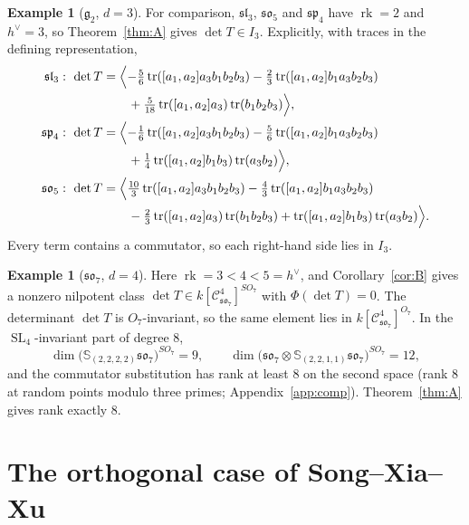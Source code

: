 \documentclass[11pt]{article}
\theoremstyle{definition}
\newtheorem{exampleblock}[theorem]{Example}
\newcommand{\g}{\mathfrak g}
\newcommand{\Cs}{\mathcal C}
\newcommand{\rk}{\operatorname{rk}}
\newcommand{\Sf}{\mathbb S}
\newcommand{\hv}{h^\vee}
\DeclareMathOperator{\SL}{SL}
\begin{document}
\begin{exampleblock}[$\g_2$, $d=3$]
For comparison, $\mathfrak{sl}_3$, $\mathfrak{so}_5$ and $\mathfrak{sp}_4$ have $\rk=2$ and $\hv=3$, so Theorem~\ref{thm:A} gives $\det T\in I_3$. Explicitly, with traces in the defining representation,
\begin{align*}
\mathfrak{sl}_3:\ \det T&=\Bigl\langle-\tfrac56\operatorname{tr}([a_1,a_2]a_3b_1b_2b_3)-\tfrac23\operatorname{tr}([a_1,a_2]b_1a_3b_2b_3)\\
&\qquad+\tfrac5{18}\operatorname{tr}([a_1,a_2]a_3)\operatorname{tr}(b_1b_2b_3)\Bigr\rangle,\\
\mathfrak{sp}_4:\ \det T&=\Bigl\langle-\tfrac16\operatorname{tr}([a_1,a_2]a_3b_1b_2b_3)-\tfrac56\operatorname{tr}([a_1,a_2]b_1a_3b_2b_3)\\
&\qquad+\tfrac14\operatorname{tr}([a_1,a_2]b_1b_3)\operatorname{tr}(a_3b_2)\Bigr\rangle,\\
\mathfrak{so}_5:\ \det T&=\Bigl\langle\tfrac{10}3\operatorname{tr}([a_1,a_2]a_3b_1b_2b_3)-\tfrac43\operatorname{tr}([a_1,a_2]b_1a_3b_2b_3)\\
&\qquad-\tfrac23\operatorname{tr}([a_1,a_2]a_3)\operatorname{tr}(b_1b_2b_3)+\operatorname{tr}([a_1,a_2]b_1b_3)\operatorname{tr}(a_3b_2)\Bigr\rangle .
\end{align*}
Every term contains a commutator, so each right-hand side lies in $I_3$.
\end{exampleblock}

\begin{exampleblock}[$\mathfrak{so}_7$, $d=4$]\label{ex:so7}
Here $\rk=3<4<5=\hv$, and Corollary~\ref{cor:B} gives a nonzero nilpotent class $\det T\in k[\Cs^4_{\mathfrak{so}_7}]^{SO_7}$ with $\Phi(\det T)=0$. The determinant $\det T$ is $O_7$-invariant, so the same element lies in $k[\Cs^4_{\mathfrak{so}_7}]^{O_7}$. In the $\SL_4$-invariant part of degree $8$,
\[
\dim\bigl(\Sf_{(2,2,2,2)}\mathfrak{so}_7\bigr)^{SO_7}=9,\qquad \dim\bigl(\mathfrak{so}_7\otimes\Sf_{(2,2,1,1)}\mathfrak{so}_7\bigr)^{SO_7}=12,
\]
and the commutator substitution has rank at least $8$ on the second space (rank $8$ at random points modulo three primes; Appendix~\ref{app:comp}). Theorem~\ref{thm:A} gives rank exactly $8$.
\end{exampleblock}

\section{The orthogonal case of Song--Xia--Xu}\label{sec:sxx}
\end{document}
